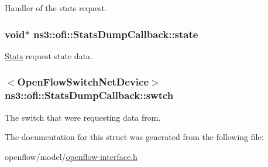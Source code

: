 Handler of the stats request. 

\subsubsection[{\texorpdfstring{state}{state}}]{\setlength{\rightskip}{0pt plus 5cm}void$\ast$ ns3\+::ofi\+::\+Stats\+Dump\+Callback\+::state}\hypertarget{structns3_1_1ofi_1_1StatsDumpCallback_a9bfa71df8899d8afa2960e60c9071af6}{}\label{structns3_1_1ofi_1_1StatsDumpCallback_a9bfa71df8899d8afa2960e60c9071af6}


\hyperlink{classns3_1_1ofi_1_1Stats}{Stats} request state data. 

\subsubsection[{\texorpdfstring{swtch}{swtch}}]{$<${\bf Open\+Flow\+Switch\+Net\+Device}$>$ ns3\+::ofi\+::\+Stats\+Dump\+Callback\+::swtch}\hypertarget{structns3_1_1ofi_1_1StatsDumpCallback_ad099136b844652e219e992794b14a512}{}\label{structns3_1_1ofi_1_1StatsDumpCallback_ad099136b844652e219e992794b14a512}


The switch that we\textquotesingle{}re requesting data from. 



The documentation for this struct was generated from the following file\+:\begin{DoxyCompactItemize}
\item 
openflow/model/\hyperlink{openflow-interface_8h}{openflow-\/interface.\+h}\end{DoxyCompactItemize}
